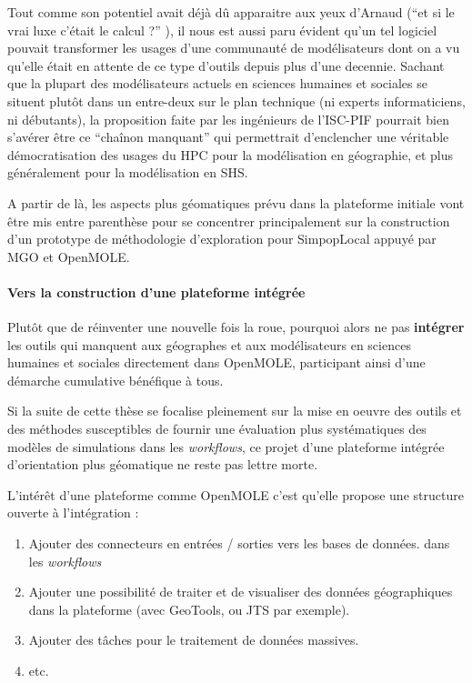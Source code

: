 Tout comme son potentiel avait déjà dû apparaitre aux yeux d'Arnaud \textcite[19-26]{Banos2013} (\enquote{et si le vrai luxe c'était le calcul ?} ), il nous est  aussi paru évident qu'un tel logiciel pouvait transformer les usages d'une communauté de modélisateurs dont on a vu qu'elle était en attente de ce type d'outils depuis plus d'une decennie. Sachant que la plupart des modélisateurs actuels en sciences humaines et sociales se situent plutôt dans un entre-deux sur le plan technique (ni experts informaticiens, ni débutants), la proposition faite par les ingénieurs de l'ISC-PIF pourrait bien s'avérer être ce \enquote{chaînon manquant} qui permettrait d'enclencher une véritable démocratisation des usages du HPC pour la modélisation en géographie, et plus généralement pour la modélisation en SHS.

A partir de là, les aspects plus géomatiques prévu dans la plateforme initiale vont être mis entre parenthèse pour se concentrer principalement sur la construction d'un prototype de méthodologie d'exploration pour SimpopLocal appuyé par MGO et OpenMOLE. %

\paragraph {Vers la construction d'une plateforme intégrée}

Plutôt que de réinventer une nouvelle fois la roue, pourquoi alors ne pas \textbf{intégrer} les outils qui manquent aux géographes et aux modélisateurs en sciences humaines et sociales directement dans OpenMOLE, participant ainsi d'une démarche cumulative bénéfique à tous.

Si la suite de cette thèse se focalise pleinement sur la mise en oeuvre des outils et des méthodes susceptibles de fournir une évaluation plus systématiques des modèles de simulations dans les \textit{workflows}, ce projet d'une plateforme intégrée d'orientation plus géomatique ne reste pas lettre morte.

L'intérêt d'une plateforme comme OpenMOLE c'est qu'elle propose une structure ouverte à l'intégration :

\begin{enumerate}[label=(\alph*),labelindent=\parindent,leftmargin=*]
\item Ajouter des connecteurs en entrées / sorties vers les bases de données. dans les \textit{workflows}
\item Ajouter une possibilité de traiter et de visualiser des données géographiques dans la plateforme (avec GeoTools, ou JTS par exemple).
\item Ajouter des tâches pour le traitement de données massives.
\item etc.
\end{enumerate}

